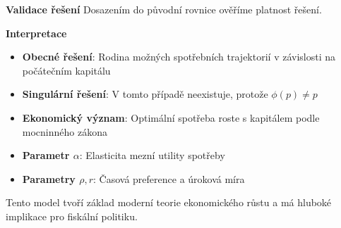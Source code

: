 \begin{example}
\vspace{1.5\baselineskip}

\noindent\textbf{Validace řešení}
Dosazením do původní rovnice ověříme platnost řešení.

\vspace{1.5\baselineskip}

\noindent\textbf{Interpretace}
\begin{itemize}
\item \textbf{Obecné řešení}: Rodina možných spotřebních trajektorií v závislosti na počátečním kapitálu
\item \textbf{Singulární řešení}: V tomto případě neexistuje, protože $\phi(p) \neq p$
\item \textbf{Ekonomický význam}: Optimální spotřeba roste s kapitálem podle mocninného zákona
\item \textbf{Parametr $\alpha$}: Elasticita mezní utility spotřeby
\item \textbf{Parametry $\rho, r$}: Časová preference a úroková míra
\end{itemize}
Tento model tvoří základ moderní teorie ekonomického růstu a má hluboké implikace pro fiskální politiku.

\end{example}


